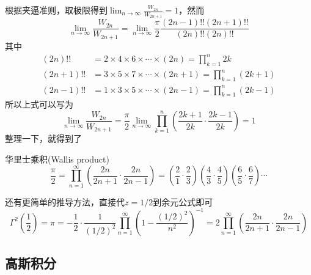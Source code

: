\documentclass[main.tex]{subfiles}
\begin{document}
根据夹逼准则，取极限得到\(\displaystyle{\lim_{n \to \infty} \frac{W_{2n}}{W_{2n+1}} = 1 }\)，然而
\[\lim_{n \to \infty} \frac{W_{2n}}{W_{2n+1}} = \lim_{n \to \infty} \frac{\pi}{2} \frac{(2n-1)!!(2n+1)!!}{(2n)!!(2n)!!}\]
其中
\begin{align*}
    (2n)!! &= 2 \times 4 \times 6 \times \cdots \times (2n) = \prod_{k=1}^{n} 2k \\
    (2n+1)!! &= 3 \times 5 \times 7 \times \cdots \times (2n+1) = \prod_{k=1}^{n} (2k+1) \\
    (2n-1)!! &= 1 \times 3 \times 5 \times \cdots \times (2n-1) = \prod_{k=1}^{n} (2k-1)
\end{align*}
所以上式可以写为
\[\lim_{n \to \infty} \frac{W_{2n}}{W_{2n+1}} = \frac{\pi}{2} \lim_{n \to \infty}  \prod_{k=1}^{n} \left(\frac{2k+1}{2k}\cdot\frac{2k-1}{2k}\right) = 1\]
整理一下，就得到了
\begin{theorem}{华里士乘积(Wallis product)}
    \[\frac{\pi}{2} = \prod_{n=1}^{\infty} \left(\frac{2n}{2n+1}\cdot\frac{2n}{2n-1}\right) = \left(\frac{2}{1}\cdot\frac{2}{3}\right)\left(\frac{4}{3}\cdot\frac{4}{5}\right)\left(\frac{6}{5}\cdot\frac{6}{7}\right)\cdots\]
\end{theorem}

还有更简单的推导方法，直接代\(z=1/2\)到余元公式即可
\[\Gamma^2\left(\frac{1}{2}\right) = \pi = -\frac{1}{2}\cdot\frac{1}{(1/2)^2}\prod_{n=1}^{\infty}\left(1-\frac{(1/2)^2}{n^2}\right)^{-1} = 2\prod_{n=1}^{\infty}\left(\frac{2n}{2n+1}\cdot\frac{2n}{2n-1}\right)\]

\subsection{高斯积分}
\end{document}
